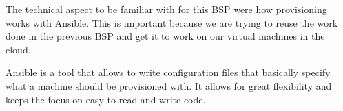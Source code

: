 The technical aspect to be familiar with for this BSP were how
provisioning works with Ansible. This is important because we are
trying to reuse the work done in the previous BSP and get it to work
on our virtual machines in the cloud.

Ansible is a tool that allows to write configuration files that
basically specify what a machine should be provisioned with. It allows
for great flexibility and keeps the focus on easy to read and write
code.
